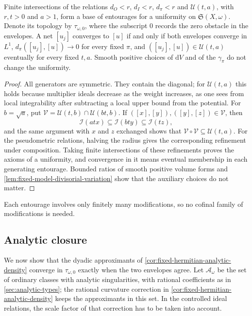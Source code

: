 \begin{proposition}\label{prop:ordinary-type-uniformity}
Finite intersections of the relations $d_O<r$, $d_I<r$, $d_\pi<r$ and $\mathcal U(t,a)$, with $r,t>0$ and $a>1$, form a base of entourages for a uniformity on $\mathfrak S(X,\omega)$. Denote its topology by $\tau_{\omega,0}$, where the subscript $0$ records the zero obstacle in the envelopes. A net $[u_j]$ converges to $[u]$ if and only if both envelopes converge in $L^1$, $d_\pi([u_j],[u])\to0$ for every fixed $\pi$, and $([u_j],[u])\in\mathcal U(t,a)$ eventually for every fixed $t,a$. Smooth positive choices of $\mathrm dV$ and of the $\gamma_\pi$ do not change the uniformity.
\end{proposition}
\begin{proof}
All generators are symmetric. They contain the diagonal; for $\mathcal U(t,a)$ this holds because multiplier ideals decrease as the weight increases, as one sees from local integrability after subtracting a local upper bound from the potential. For $b=\sqrt a$, put $\mathcal V=\mathcal U(t,b)\cap\mathcal U(bt,b)$. If $([x],[y]),([y],[z])\in\mathcal V$, then
\[
 \mathcal I(atx)\subseteq\mathcal I(bty)\subseteq\mathcal I(tz),
\]
and the same argument with $x$ and $z$ exchanged shows that $\mathcal V\circ\mathcal V\subseteq\mathcal U(t,a)$. For the pseudometric relations, halving the radius gives the corresponding refinement under composition. Taking finite intersections of these refinements proves the axioms of a uniformity, and convergence in it means eventual membership in each generating entourage. Bounded ratios of smooth positive volume forms and \cref{lem:fixed-model-divisorial-variation} show that the auxiliary choices do not matter.
\end{proof}

Each entourage involves only finitely many modifications, so no cofinal family of modifications is needed.

\subsection{Analytic closure}

We now show that the dyadic approximants of \cref{cor:fixed-hermitian-analytic-density} converge in $\tau_{\omega,0}$ exactly when the two envelopes agree. Let $\mathcal A_\omega$ be the set of ordinary classes with analytic singularities, with rational coefficients as in \cref{sec:analytic-types}; the rational curvature correction in \cref{cor:fixed-hermitian-analytic-density} keeps the approximants in this set. In the controlled ideal relations, the scale factor of that correction has to be taken into account.

